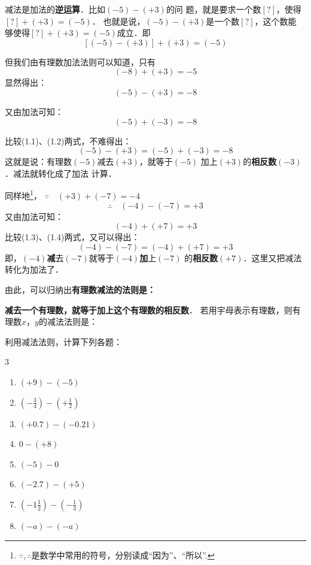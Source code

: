 减法是加法的\textbf{逆运算}．比如$(-5)-(+3)$的问
题，就是要求一个数$[?]$，使得$[?]+(+3)=(-5)$．
也就是说，$(-5)-(+ 3)$是一个数$[?]$，这个数能
够使得$[?]+(+3)=(-5)$成立．即
$$[(-5)-(+3) ]+(+3)=(-5)$$

    但我们由有理数加法法则可以知道，只有
\[(-8)+(+3)=-5\]
显然得出：
\begin{equation}
    (-5)-(+3)=-8
\end{equation}

又由加法可知：
\begin{equation}
    (-5)+(-3)=-8
\end{equation}

比较(1.1)、(1.2)两式，不难得出：
     \[ (-5)-(+3)=(-5)+(-3)=-8\]
这就是说：有理数$(-5)$减去$(+ 3)$，就等于$(-5)$
加上$(+ 3)$的\textbf{相反数}$(-3)$．减法就转化成了加法
计算．

    同样地\footnote{$\because,\therefore$是数学中常用的符号，分别读成“因为”、“所以”.}，
    \qquad$\because\quad (+3)+(-7)=-4$
    \begin{equation}
     \therefore\quad    (-4)-(-7)=+3
    \end{equation}    
    又由加法可知：
    \begin{equation}
        (-4)+(+7)=+3
    \end{equation}
    比较(1.3)、(1.4)两式，又可以得出：
    \[ (-4)-(-7)= (-4)+(+7)=+3\]
    即，$(-4)$\textbf{减}去$(-7)$就等于$(-4)$\textbf{加}上$(-7)$
    的\textbf{相反数}$(+7)$．这里又把减法转化为加法了．

        由此，可以归纳出\textbf{有理数减法的法则是：}

        \textbf{减去一个有理数，就等于加上这个有理数的相反数}．
        若用宇母表示有理数，则有理数$x$，$y$的减法法则是：
    
\begin{center}
\end{center}

\begin{example}
    利用减法法则，计算下列各题：
\begin{multicols}{3}
    \begin{enumerate}
        \item $(+9)-(-5)$
        \item $\left(-\frac{3}{4}\right)-\left(+\frac{1}{2}\right)$
        \item $(+0.7)-(-0.21)$
        \item $0-(+8)$
        \item $(-5)-0$
        \item $(-2.7)-(+5)$
        \item $\left(-1\frac{1}{2}\right)-\left(-\frac{1}{3}\right)$
        \item $(-a)-(-a)$
    \end{enumerate}
\end{multicols}
\end{example}

